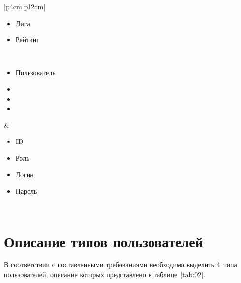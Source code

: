 \begin{table}[h!]
\begin{center}
\begin{threeparttable}
\begin{tabular}{|p{4cm}|p{12cm}|}
\begin{minipage}[t]{\linewidth}
\begin{multicols}{2}
\begin{itemize}[leftmargin=0mm,labelsep=0mm,nosep,after=\strut]
                  \item[] Лига
                  \item[] Рейтинг
                \end{itemize}
              \end{multicols}
            \end{minipage}\\
            \hline
            \begin{minipage}[t]{\linewidth}
              \begin{multicols}{0}
                \begin{itemize}[leftmargin=0mm,labelsep=0mm,nosep,after=\strut]
                  \item[] Пользователь
                  \item[]
                  \item[]
                  \item[]
                \end{itemize}
              \end{multicols}
            \end{minipage}
          & \begin{minipage}[t]{\linewidth}
              \begin{multicols}{2}
                \begin{itemize}[leftmargin=0mm,labelsep=0mm,nosep,after=\strut]
                  \item[] ID
                  \item[] Роль
                  \item[] Логин
                  \item[] Пароль
                \end{itemize}
              \end{multicols}
            \end{minipage}\\
           \hline
        \end{tabular}
    \end{threeparttable}
    \end{center}
\end{table} 

\section{Описание типов пользователей}

В соответствии с поставленными требованиями необходимо выделить 4~типа
пользователей, описание которых представлено в таблице~\ref{tab:02}.

